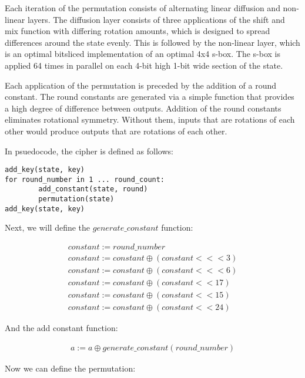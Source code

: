 \documentclass[preprint]{iacrtrans}
\begin{document}
Each iteration of the permutation consists of alternating linear diffusion and non-linear layers. The diffusion layer consists of three applications of the shift and mix function with differing rotation amounts, which is designed to spread differences around the state evenly. This is followed by the non-linear layer, which is an optimal bitsliced implementation of an optimal 4x4 s-box. The s-box is applied 64 times in parallel on each 4-bit high 1-bit wide section of the state.

Each application of the permutation is preceded by the addition of a round constant. The round constants are generated via a simple function that provides a high degree of difference between outputs. Addition of the round constants eliminates rotational symmetry. Without them, inputs that are rotations of each other would produce outputs that are rotations of each other. 

In psuedocode, the cipher is defined as follows:

\begin{verbatim}
add_key(state, key)
for round_number in 1 ... round_count:
        add_constant(state, round)
        permutation(state)
add_key(state, key)
\end{verbatim}

Next, we will define the $generate\_constant$ function:

\begin{align}
constant := round\_number\\
constant := constant \oplus (constant <<< 3)\\
constant := constant \oplus (constant <<< 6)\\
constant := constant \oplus (constant << 17)\\
constant := constant \oplus (constant << 15)\\
constant := constant \oplus (constant << 24)
\end{align}

And the add constant function:

\begin{align}
a := a \oplus generate\_constant(round\_number)
\end{align}

Now we can define the permutation:
\end{document}
